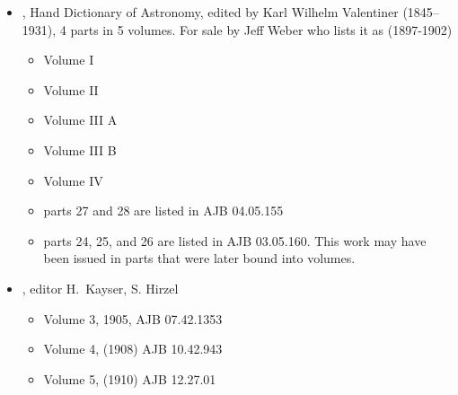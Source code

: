 
\begin{itemize}
\item {}, Hand
  Dictionary of Astronomy, edited by Karl Wilhelm Valentiner
  (1845--1931), 4 parts in 5 volumes. For sale by Jeff Weber who lists
  it as (1897-1902)

  \begin{itemize}
  \item Volume I
  \item Volume II
  \item Volume III A
  \item Volume III B
  \item Volume IV
  \item parts 27 and 28 are listed in AJB 04.05.155
  \item parts 24, 25, and 26 are listed in AJB 03.05.160. This work may
    have been issued in parts that were later bound into volumes.
  \end{itemize}
  

\item {}, editor H.\ Kayser, S. Hirzel
  \begin{itemize}
  \item Volume 3, 1905, AJB 07.42.1353
  \item Volume 4, (1908) AJB 10.42.943
  \item Volume 5, (1910) AJB 12.27.01
  \end{itemize}
  

\end{itemize}

